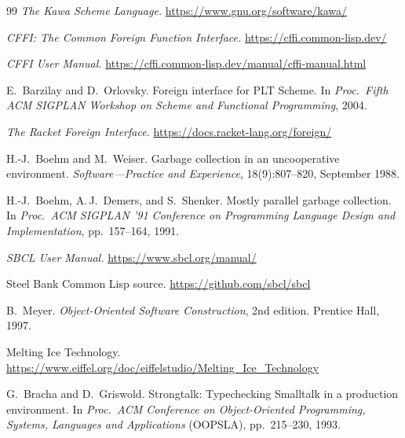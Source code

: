 \documentclass[11pt]{article}
\begin{document}
\begin{thebibliography}{99}
\emph{The Kawa Scheme Language.}
\newblock \url{https://www.gnu.org/software/kawa/}


\emph{CFFI: The Common Foreign Function Interface.}
\newblock \url{https://cffi.common-lisp.dev/}

\emph{CFFI User Manual.}
\newblock \url{https://cffi.common-lisp.dev/manual/cffi-manual.html}


E.~Barzilay and D.~Orlovsky.
\newblock Foreign interface for {PLT Scheme}.
\newblock In \emph{Proc.\ Fifth ACM SIGPLAN Workshop on Scheme and
  Functional Programming}, 2004.

\emph{The Racket Foreign Interface.}
\newblock \url{https://docs.racket-lang.org/foreign/}


H.-J.\ Boehm and M.~Weiser.
\newblock Garbage collection in an uncooperative environment.
\newblock \emph{Software---Practice and Experience},
  18(9):807--820, September 1988.

H.-J.\ Boehm, A.\,J.\ Demers, and S.~Shenker.
\newblock Mostly parallel garbage collection.
\newblock In \emph{Proc.\ ACM SIGPLAN '91 Conference on Programming
  Language Design and Implementation}, pp.~157--164, 1991.


\emph{SBCL User Manual.}
\newblock \url{https://www.sbcl.org/manual/}

Steel Bank Common Lisp source.
\newblock \url{https://github.com/sbcl/sbcl}


B.~Meyer.
\newblock \emph{Object-Oriented Software Construction}, 2nd edition.
\newblock Prentice Hall, 1997.

Melting Ice Technology.
\newblock \url{https://www.eiffel.org/doc/eiffelstudio/Melting_Ice_Technology}


G.~Bracha and D.~Griswold.
\newblock Strongtalk: Typechecking {Smalltalk} in a production
  environment.
\newblock In \emph{Proc.\ ACM Conference on Object-Oriented
  Programming, Systems, Languages and Applications} (OOPSLA),
  pp.~215--230, 1993.


\end{thebibliography}
\end{document}
